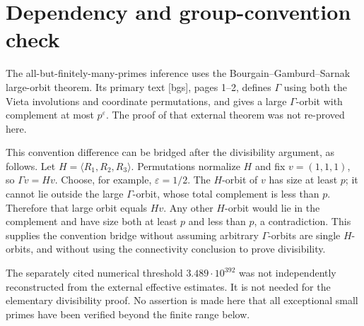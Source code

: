 \documentclass[10pt]{article}
\begin{document}
\section*{Dependency and group-convention check}
The all-but-finitely-many-primes inference uses the Bourgain–Gamburd–Sarnak large-orbit theorem. Its primary text [bgs], pages 1–2, defines \(\Gamma\) using both the Vieta involutions and coordinate permutations, and gives a large \(\Gamma\)-orbit with complement at most \(p^\varepsilon\). The proof of that external theorem was not re-proved here.\par
This convention difference can be bridged after the divisibility argument, as follows. Let \(H=\langle R_1,R_2,R_3\rangle\). Permutations normalize \(H\) and fix \(v=(1,1,1)\), so \(\Gamma v=Hv\). Choose, for example, \(\varepsilon=1/2\). The \(H\)-orbit of \(v\) has size at least \(p\); it cannot lie outside the large \(\Gamma\)-orbit, whose total complement is less than \(p\). Therefore that large orbit equals \(Hv\). Any other \(H\)-orbit would lie in the complement and have size both at least \(p\) and less than \(p\), a contradiction. This supplies the convention bridge without assuming arbitrary \(\Gamma\)-orbits are single \(H\)-orbits, and without using the connectivity conclusion to prove divisibility.\par
The separately cited numerical threshold \(3.489\cdot10^{392}\) was not independently reconstructed from the external effective estimates. It is not needed for the elementary divisibility proof. No assertion is made here that all exceptional small primes have been verified beyond the finite range below.\par
\end{document}
